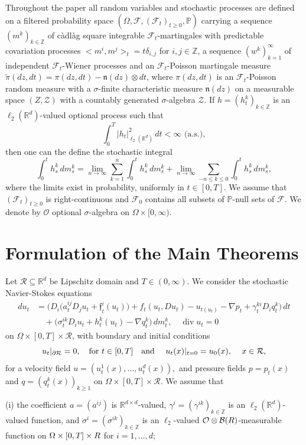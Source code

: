 \documentclass[11pt,reqno]{amsart}
\newcommand{\mysection}[1]{\section{#1}

      \setcounter{equation}{0}}
\theoremstyle{definition}
\theoremstyle{remark}
\newcommand\bR{\mathbb{R}}
\newcommand\bZ{\mathbb{Z}}
\newcommand\frf{\mathfrak{f}}
\newcommand\frn{\mathfrak{n}}
\newcommand\cF{\mathcal{F}}
\newcommand\cO{\mathcal{O}}
\newcommand\cR{\mathcal{R}}
\newcommand\cZ{\mathcal{Z}}
\newcommand{\<}{\langle}
\renewcommand{\>}{\rangle}
\newcommand{\F}{\mathcal{F}}
\renewcommand{\P}{\mathbb{P}}
\begin{document}
Throughout the paper all random variables 
and stochastic processes are defined on a filtered probability space
$(\Omega,\mathcal{F},(\mathcal{F}_t)_{t\ge0},\mathbb{P})$
carrying a sequence
$(m^k)_{k\in\bZ}$
of  c\`adl\`ag square integrable $\mathcal{F}_t$-martingales with 
predictable covariation processes  $<m^i,m^j>_t=t\delta_{i,j}$ for $i,j\in\bZ$, 
a sequence $(w^k)_{k=1}^{\infty}$ of independent 
$\cF_t$-Wiener processes and an $\cF_t$-Poisson martingale measure 
$\tilde\pi(dz,dt)=\pi(dz,dt)-\frn(dz)\otimes dt$, where $\pi(dz,dt)$ is an 
$\cF_t$-Poisson random measure with a $\sigma$-finite characteristic measure 
$\frn(dz)$ 
on a measurable space $(Z,\cZ)$ with a countably generated $\sigma$-algebra $\cZ$.   
If $h=(h_t^k)_{k\in\bZ}$ is an $\ell_2(\bR^d)$-valued optional process such that 
$$
\int_0^T|h_t|^2_{\ell_2(\bR^d)}\,dt<\infty \,\,\text{(a.s.)}, 
$$
then one can the define the stochastic integral 
$$
\int_0^th^k_s\,dm_s^k
=\lim_{n\to\infty}\sum_{k=1}^{n}\int_0^th^k_s\,dm^k_s
+\lim_{n\to\infty}\sum_{-n\leq k\leq 0}\int_0^th^k_s\,dm^k_s, 
$$
where the limits exist in probability,  uniformly in $t\in[0,T]$. 
We assume that $(\cF_t)_{t\geq0}$ is right-continuous 
and $\F_0$ contains all subsets of $\P$-null sets of $\F$. 
We denote by $\cO$ optional 
$\sigma$-algebra on $\Omega\times[0,\infty)$. 


\mysection{ Formulation of the Main Theorems}

Let $\cR\subseteq\bR^d$ be Lipschitz domain and $T\in(0,\infty)$.  
We consider the stochastic Navier-Stokes equations                                               
\begin{align}
du_t
&=\Big(D_i\big(a_t^{ij}D_j u_t + \frf_t^i(u_t)\big)
+ f_t(u_t,Du_t)- u_{t(u_t)}-\nabla p_t+ \gamma_t^{ki}D_i q_t^k\Big)\,dt \nonumber\\
&\quad+\Big(\sigma_t^{ik}D_i u_t+ h_t^k(u_t)-\nabla q_t^k\Big)\,dm_t^k,\label{SNS2}
\quad
\operatorname{div}u_t=0
\end{align}
on $\Omega\times[0,T]\times\cR$, 
with boundary and initial 
conditions 
\begin{equation}
                                                         \label{bin2}
u_t|_{\partial \cR}=0, \quad \text{for $t\in[0,T]$\quad 
and
\quad 
$u_t(x)|_{t=0}=u_0(x)$,
\quad$ x\in \cR$},
\end{equation}
for a velocity field
$
u=(u^1_t(x),\dots,u^d_t(x)),
$
and pressure fields
$
p=p_t(x)$ and $
q=(q_t^k(x))_{k\ge1}
$
on $\Omega\times[0,T]\times\cR$. 
We assume that 


(i)
the coefficient
$a=(a^{ij})$
is $\mathbb{R}^{d\times d}$-valued,
$\gamma^i=(\gamma^{ik})_{k\in\bZ}$
is an $\ell_2(\mathbb{R}^d)$-valued function, and
$\sigma^i=(\sigma^{ik})_{k\in\bZ}$
is an $\ell_2$-valued 
$\cO\otimes\mathcal B(\mathbb \cR)$-measurable function on
$\Omega\times[0,T]\times\mathbb \cR$ for  $i=1,\dots,d$;
\end{document}
